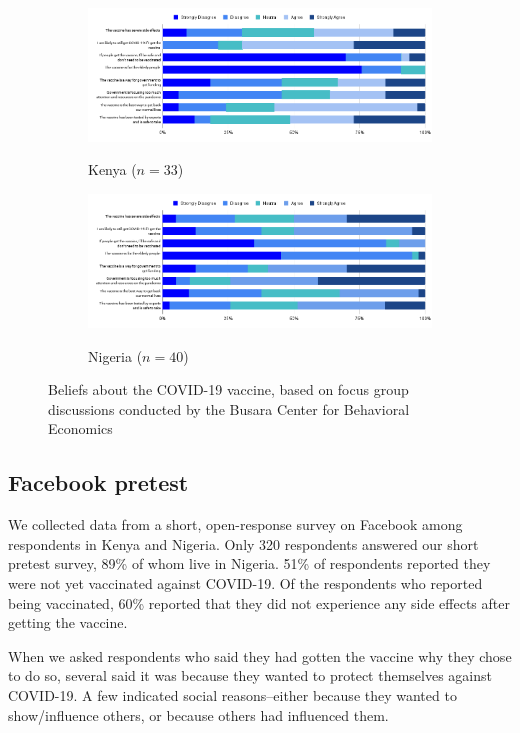 \documentclass[letterpaper, 12pt, parskip=full,DIV=10]{scrartcl}
\begin{document}
\begin{figure}[htbp]
   \centering
   \begin{subfigure}{\textwidth}
  \centering
  \caption{Kenya ($n = 33$)}
  \includegraphics[width = \textwidth]{../../tables-figures/qual-beliefsKY.png} 
  \label{fig:qualKY}
\end{subfigure}
\begin{subfigure}{\textwidth}
  \centering
  \caption{Nigeria ($n = 40$)}
  \includegraphics[width = \textwidth]{../../tables-figures/qual-beliefsNG.png} 
  \label{fig:qualNG}
\end{subfigure}
   \caption{Beliefs about the COVID-19 vaccine, based on focus group discussions conducted by the Busara Center for Behavioral Economics}
   \label{fig:qual}
\end{figure}


\subsection{Facebook pretest}
We collected data from a short, open-response survey on Facebook among respondents in Kenya and Nigeria. Only 320 respondents answered our short pretest survey, 89\% of whom live in Nigeria. 51\% of respondents reported they were not yet vaccinated against COVID-19. Of the respondents who reported being vaccinated, 60\% reported that they did not experience any side effects after getting the vaccine.

When we asked respondents who said they had gotten the vaccine why they chose to do so, several said it was because they wanted to protect themselves against COVID-19. A few indicated social reasons--either because they wanted to show/influence others, or because others had influenced them.
\end{document}
